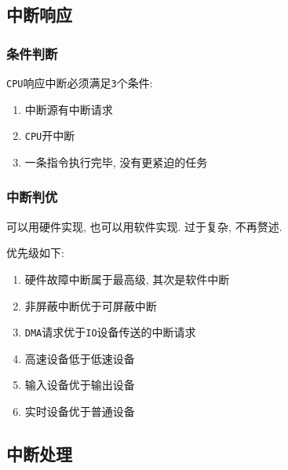 \subsection{中断响应}
\subsubsection{条件判断}
\verb|CPU|响应中断必须满足\verb|3|个条件:
\begin{enumerate}
\item 中断源有中断请求
\item \verb|CPU|开中断
\item 一条指令执行完毕, 没有更紧迫的任务
\end{enumerate}
\subsubsection{中断判优}
可以用硬件实现, 也可以用软件实现. 过于复杂, 不再赘述.\par
优先级如下:
\begin{enumerate}
\item 硬件故障中断属于最高级, 其次是软件中断
\item 非屏蔽中断优于可屏蔽中断
\item \verb|DMA|请求优于\verb|IO|设备传送的中断请求
\item 高速设备低于低速设备
\item 输入设备优于输出设备
\item 实时设备优于普通设备
\end{enumerate}
\subsection{中断处理}
